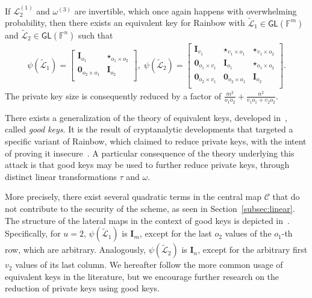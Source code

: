 \documentclass[12pt, a4paper, oneside]{memoir}
\theoremstyle{definition}
\begin{document}
If $\mathcal{L}_{2}^{(1)}$ and $\omega^{(3)}$ are invertible, which once again happens with overwhelming probability, then there exists an equivalent key for Rainbow with $\widetilde{\mathcal{L}}_{1} \in \mathsf{GL}(\mathbb{F}^{m})$ and $\widetilde{\mathcal{L}}_{2} \in \mathsf{GL}(\mathbb{F}^{n})$ such that
\begin{align}
  \psi(\widetilde{\mathcal{L}}_{1}) =
  \begin{bmatrix}
    \mathbf{I}_{o_{1}} & \star_{o_{1} \times o_{2}} \\
    \mathbf{0}_{o_{2} \times o_{1}} & \mathbf{I}_{o_{2}} \\
  \end{bmatrix},\;
  \psi(\widetilde{\mathcal{L}}_{2}) =
  \begin{bmatrix}
    \mathbf{I}_{v_{1}} & \star_{v_{1} \times o_{1}} & \star_{v_{1} \times o_{2}} \\
    \mathbf{0}_{o_{1} \times v_{1}} & \mathbf{I}_{o_{1}} & \star_{o_{1} \times o_{2}} \\
    \mathbf{0}_{o_{2} \times v_{1}} & \mathbf{0}_{o_{2} \times o_{1}} & \mathbf{I}_{o_{2}} \\
  \end{bmatrix}.
\end{align}
The private key size is consequently reduced by a factor of $\frac{m^{2}}{o_{1} o_{2}} + \frac{n^{2}}{v_{1} o_{1} + v_{2} o_{2}}$.

There exists a generalization of the theory of equivalent keys, developed in~\cite{Thomae:201306}, called \emph{good keys}. It is the result of cryptanalytic developments that targeted a specific variant of Rainbow, which claimed to reduce private keys, with the intent of proving it insecure~\cite{Thomae:201207}. A particular consequence of the theory underlying this attack is that good keys may be used to further reduce private keys, through distinct linear transformations $\tau$ and $\omega$. 

More precisely, there exist several quadratic terms in the central map $\mathcal{C}$ that do not contribute to the security of the scheme, as seen in Section~\ref{subsec:linear}. The structure of the lateral maps in the context of good keys is depicted in~\cite[Fig.~3]{Shim:202001}. Specifically, for $u = 2$, $\psi(\widetilde{\mathcal{L}}_{1})$ is $\mathbf{I}_{m}$, except for the last $o_{2}$ values of the $o_{1}$-th row, which are arbitrary. Analogously, $\psi(\widetilde{\mathcal{L}}_{2})$ is $\mathbf{I}_{n}$, except for the arbitrary first $v_{2}$ values of its last column. We hereafter follow the more common usage of equivalent keys in the literature, but we encourage further research on the reduction of private keys using good keys.
\end{document}
